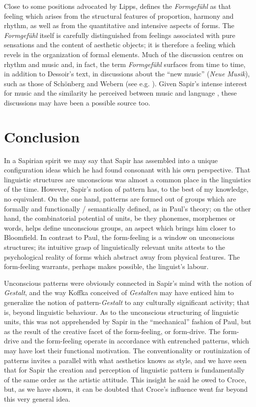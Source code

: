 \documentclass[output=paper]{langscibook}
\begin{document}
Close to some positions advocated by Lipps, \citet{Dessoir1906} defines the \emph{Formgefühl} as that feeling which arises from the structural features of proportion, harmony and rhythm, as well as from the quantitative and intensive aspects of forms. The \emph{Formgefühl} itself is carefully distinguished from feelings associated with pure sensations and the content of aesthetic objects; it is therefore a feeling which revels in the organization of formal elements. Much of the discussion centres on rhythm and music and, in fact, the term \emph{Formgefühl} surfaces from time to time, in addition to Dessoir's text, in discussions about the ``new music'' (\emph{Neue Musik}), such as those of Schönberg and Webern (see e.g. \citealt{Webern1912}). Given Sapir's intense interest for music and the similarity he perceived between music and language \citep[156]{Darnell1990}, these discussions may have been a possible source too.

\section{Conclusion}
\label{sec:fortis:conc}

In a Sapirian spirit we may say that Sapir has assembled into a unique configuration ideas which he had found consonant with his own perspective. That linguistic structures are unconscious was almost a common place in the linguistics of the time. However, Sapir's notion of pattern has, to the best of my knowledge, no equivalent. On the one hand, patterns are formed out of groups which are formally and functionally / semantically defined, as in Paul's theory; on the other hand, the combinatorial potential of units, be they phonemes, morphemes or words, helps define unconscious groups, an aspect which brings him closer to Bloomfield. In contrast to Paul, the form-feeling is a window on unconscious structures; its intuitive grasp of linguistically relevant units attests to the psychological reality of forms which abstract away from physical features. The form-feeling warrants, perhaps makes possible, the linguist's labour.

Unconscious patterns were obviously connected in Sapir's mind with the notion of \emph{Gestalt}, and the way Koffka conceived of \emph{Gestalten} may have enticed him to generalize the notion of pattern-\emph{Gestalt} to any culturally significant activity; that is, beyond linguistic behaviour. As to the unconscious structuring of linguistic units, this was not apprehended by Sapir in the ``mechanical'' fashion of Paul, but as the result of the creative facet of the form-feeling, or form-drive. The form-drive and the form-feeling operate in accordance with entrenched patterns, which may have lost their functional motivation. The conventionality or routinization of patterns invites a parallel with what aesthetics knows as style, and we have seen that for Sapir the creation and perception of linguistic pattern is fundamentally of the same order as the artistic attitude. This insight he said he owed to Croce, but, as we have shown, it can be doubted that Croce's influence went far beyond this very general idea.
\end{document}
